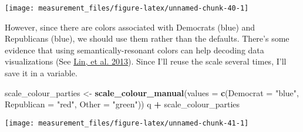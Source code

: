 \documentclass[]{book}
\newenvironment{Shaded}{\begin{snugshade}}{\end{snugshade}}
\newcommand{\KeywordTok}[1]{\textcolor[rgb]{0.13,0.29,0.53}{\textbf{#1}}}
\newcommand{\DataTypeTok}[1]{\textcolor[rgb]{0.13,0.29,0.53}{#1}}
\newcommand{\DecValTok}[1]{\textcolor[rgb]{0.00,0.00,0.81}{#1}}
\newcommand{\StringTok}[1]{\textcolor[rgb]{0.31,0.60,0.02}{#1}}
\newcommand{\CommentTok}[1]{\textcolor[rgb]{0.56,0.35,0.01}{\textit{#1}}}
\newcommand{\OperatorTok}[1]{\textcolor[rgb]{0.81,0.36,0.00}{\textbf{#1}}}
\newcommand{\NormalTok}[1]{#1}
\theoremstyle{definition}
\theoremstyle{definition}
\theoremstyle{definition}
\theoremstyle{remark}
\begin{document}
\begin{center}\texttt{[image: measurement\_files/figure-latex/unnamed-chunk-40-1]} \end{center}

However, since there are colors associated with Democrats (blue) and
Republicans (blue), we should use them rather than the defaults. There's
some evidence that using semantically-resonant colors can help decoding
data visualizations (See
\href{http://vis.stanford.edu/files/2013-SemanticColor-EuroVis.pdf}{Lin,
et al. 2013}). Since I'll reuse the scale several times, I'll save it in
a variable.

\begin{Shaded}
\begin{Highlighting}[]
\NormalTok{scale_colour_parties <-}
\StringTok{  }\KeywordTok{scale_colour_manual}\NormalTok{(}\DataTypeTok{values =} \KeywordTok{c}\NormalTok{(}\DataTypeTok{Democrat =} \StringTok{"blue"}\NormalTok{,}
                                 \DataTypeTok{Republican =} \StringTok{"red"}\NormalTok{,}
                                 \DataTypeTok{Other =} \StringTok{"green"}\NormalTok{))}
\NormalTok{q }\OperatorTok{+}\StringTok{ }\NormalTok{scale_colour_parties}
\end{Highlighting}
\end{Shaded}

\begin{center}\texttt{[image: measurement\_files/figure-latex/unnamed-chunk-41-1]} \end{center}

\begin{Shaded}
\end{Shaded}
\end{document}
